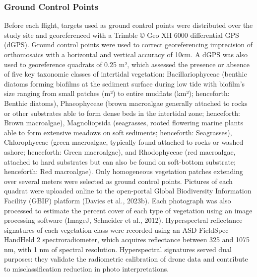 \documentclass[
  letterpaper,
  11pt,
  english,
  singlespacing,
  headsepline]{MastersDoctoralThesis}
\begin{document}
\begin{spacing}{1.5}
\begin{table}
{}

\end{table}%

\subsubsection{Ground Control Points}\label{ground-control-points}

Before each flight, targets used as ground control points were
distributed over the study site and georeferenced with a Trimble © Geo
XH 6000 differential GPS (dGPS). Ground control points were used to
correct georeferencing imprecision of orthomosaics with a horizontal and
vertical accuracy of 10cm. A dGPS was also used to georeference quadrats
of 0.25 m², which assessed the presence or absence of five key taxonomic
classes of intertidal vegetation: Bacillariophyceae (benthic diatoms
forming biofilms at the sediment surface during low tide with biofilm's
size ranging from small patches (m²) to entire mudflats (km²);
henceforth: Benthic diatoms), Phaeophyceae (brown macroalgae generally
attached to rocks or other substrates able to form dense beds in the
intertidal zone; henceforth: Brown macroalgae), Magnoliopsida
(seagrasses, rooted flowering marine plants able to form extensive
meadows on soft sediments; henceforth: Seagrasses), Chlorophyceae (green
macroalgae, typically found attached to rocks or washed ashore;
henceforth: Green macroalgae), and Rhodophyceae (red macroalgae,
attached to hard substrates but can also be found on soft-bottom
substrate; henceforth: Red macroalgae). Only homogeneous vegetation
patches extending over several meters were selected as ground control
points. Pictures of each quadrat were uploaded online to the open-portal
Global Biodiversity Information Facility (GBIF) platform (Davies et al.,
2023b). Each photograph was also processed to estimate the percent cover
of each type of vegetation using an image processing software (ImageJ,
Schneider et al., 2012). Hyperspectral reflectance signatures of each
vegetation class were recorded using an ASD FieldSpec HandHeld 2
spectroradiometer, which acquires reflectance between 325 and 1075 nm,
with 1 nm of spectral resolution. Hyperspectral signatures served dual
purposes: they validate the radiometric calibration of drone data and
contribute to misclassification reduction in photo interpretations.

\begin{figure}

\centering{

}
\end{figure}
\end{spacing}
\end{document}
